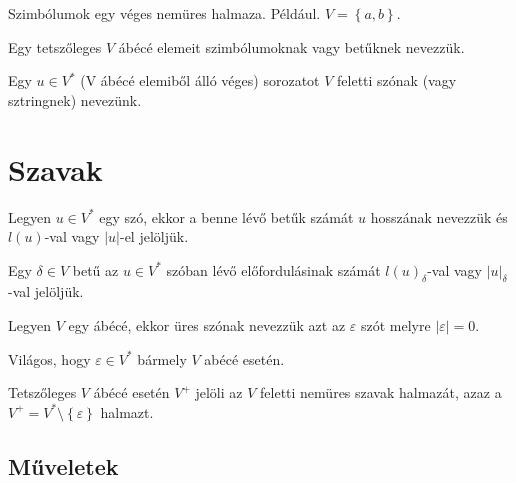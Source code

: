 \begin{definition*}[ábécé]
	Szimbólumok egy véges nemüres halmaza. Például. $ V = \left\lbrace a,b \right\rbrace $.
\end{definition*}

\begin{definition*}[szimbólum]
	Egy tetszőleges $ V $ ábécé elemeit szimbólumoknak vagy betűknek nevezzük.
\end{definition*}

\begin{definition*}[szó]
	Egy $ u \in V^* $ (V ábécé elemiből álló véges) sorozatot $ V $ feletti szónak (vagy sztringnek) nevezünk.
\end{definition*}

\section{Szavak}

\begin{definition*}
	Legyen $ u \in V^* $ egy szó, ekkor a benne lévő betűk számát $u$ hosszának nevezzük  és $ l(u) $-val vagy $\left| u \right| $-el jelöljük.
\end{definition*}

\begin{notation*}
	Egy $ \delta \in V $ betű az $ u \in V^* $ szóban lévő előfordulásinak számát $ l(u)_{\delta} $-val vagy $ \left| u \right|_{\delta} $-val jelöljük.
\end{notation*}

\begin{definition*}
	Legyen $V$ egy ábécé, ekkor üres szónak nevezzük azt az $ \varepsilon $ szót melyre $ \left| \varepsilon \right| = 0 $. 
\end{definition*}

\begin{remark}
	Világos, hogy $ \varepsilon \in V^* $  bármely $ V $ abécé esetén.
\end{remark}

\begin{definition*}[$ V^+ $]
	Tetszőleges $ V $ ábécé esetén $ V^+ $ jelöli az $ V $ feletti nemüres szavak halmazát, azaz a $ V^+ = V^* \setminus \left\lbrace \varepsilon \right\rbrace $ halmazt. 
\end{definition*}

\subsection{Műveletek}
